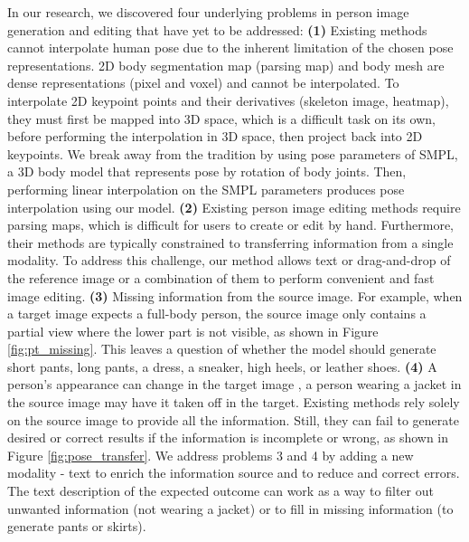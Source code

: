 \documentclass[10pt,twocolumn,letterpaper]{article}
\begin{document}
In our research, we discovered four underlying problems in person image generation and editing that have yet to be addressed: \textbf{(1)} Existing methods cannot interpolate human pose due to the inherent limitation of the chosen pose representations. 2D body segmentation map (parsing map) and body mesh are dense representations (pixel and voxel) and cannot be interpolated. To interpolate 2D keypoint points and their derivatives (skeleton image, heatmap), they must first be mapped into 3D space, which is a difficult task on its own, before performing the interpolation in 3D space, then project back into 2D keypoints. We break away from the tradition by using pose parameters of  SMPL\cite{smpl}, a 3D body model that represents pose by rotation of body joints. Then, performing linear interpolation on the SMPL parameters produces pose interpolation using our model. \textbf{(2)} Existing person image editing methods require parsing maps, which is difficult for users to create or edit by hand. Furthermore, their methods are typically constrained to transferring information from a single modality. To address this challenge, our method allows text or drag-and-drop of the reference image or a combination of them to perform convenient and fast image editing. \textbf{(3)} Missing information from the source image. For example, when a target image expects a full-body person, the source image only contains a partial view where the lower part is not visible, as shown in Figure \ref{fig:pt_missing}. This leaves a question of whether the model should generate short pants, long pants, a dress, a sneaker, high heels, or leather shoes. \textbf{(4)} A person's appearance can change in the target image \eg, a person wearing a jacket in the source image may have it taken off in the target. Existing methods rely solely on the source image to provide all the information. Still, they can fail to generate desired or correct results if the information is incomplete or wrong, as shown in Figure \ref{fig:pose_transfer}. We address problems 3 and 4 by adding a new modality - text to enrich the information source and to reduce and correct errors. The text description of the expected outcome can work as a way to filter out unwanted information (not wearing a jacket) or to fill in missing information (to generate pants or skirts).
\end{document}

